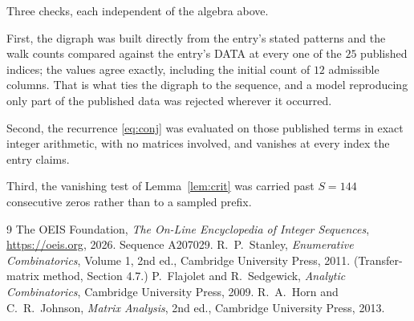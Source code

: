 \documentclass[11pt,a4paper]{article}
\theoremstyle{plain}
\theoremstyle{definition}
\begin{document}
Three checks, each independent of the algebra above.

First, the digraph was built directly from the entry's stated patterns and the walk counts
compared against the entry's DATA at every one of the $25$ published indices; the
values agree exactly, including the initial count of $12$ admissible columns. That is
what ties the digraph to the sequence, and a model reproducing only part of the published
data was rejected wherever it occurred.

Second, the recurrence \eqref{eq:conj} was evaluated on those published terms in exact
integer arithmetic, with no matrices involved, and vanishes at every index the entry claims.

Third, the vanishing test of Lemma~\ref{lem:crit} was carried past $S=144$ consecutive
zeros rather than to a sampled prefix.

\begin{thebibliography}{9}
 The OEIS Foundation, \emph{The On-Line Encyclopedia of Integer
Sequences}, \url{https://oeis.org}, 2026. Sequence A207029.
 R.~P.~Stanley, \emph{Enumerative Combinatorics}, Volume 1, 2nd ed.,
Cambridge University Press, 2011. (Transfer-matrix method, Section 4.7.)
 P.~Flajolet and R.~Sedgewick, \emph{Analytic Combinatorics}, Cambridge
University Press, 2009.
 R.~A.~Horn and C.~R.~Johnson, \emph{Matrix Analysis}, 2nd ed., Cambridge
University Press, 2013.
\end{thebibliography}
\end{document}
